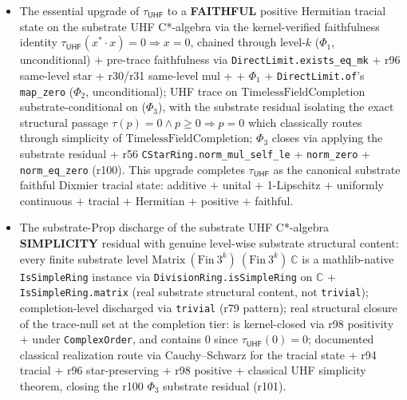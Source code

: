 \documentclass[11pt,a4paper]{amsart}
\theoremstyle{plain}
\theoremstyle{definition}
\begin{document}
\begin{itemize}[itemsep=2pt,leftmargin=2em]
\item The essential upgrade of $\tau_{\textsf{UHF}}$ to a \textbf{FAITHFUL} positive Hermitian tracial state on the substrate UHF C*-algebra via the kernel-verified faithfulness identity $\tau_{\textsf{UHF}}(x^* \cdot x) = 0 \Rightarrow x = 0$, chained through level-$k$  ($\Phi_1$, unconditional) $+$ pre-trace faithfulness via \texttt{DirectLimit.exists\_eq\_mk} + r96 same-level star + r30/r31 same-level mul +  + $\Phi_1$ + \texttt{DirectLimit.of}'s \texttt{map\_zero} ($\Phi_2$, unconditional); UHF trace on $\mathrm{TimelessFieldCompletion}$ substrate-conditional on  ($\Phi_3$), with the substrate residual isolating the exact structural passage $\tau(p) = 0 \wedge p \ge 0 \Rightarrow p = 0$ which classically routes through simplicity of $\mathrm{TimelessFieldCompletion}$; $\Phi_3$ closes via applying the substrate residual + r56 \texttt{CStarRing.norm\_mul\_self\_le} + \texttt{norm\_zero} + \texttt{norm\_eq\_zero} (r100). This upgrade completes $\tau_{\textsf{UHF}}$ as the canonical substrate faithful Dixmier tracial state: additive $+$ unital $+$ 1-Lipschitz $+$ uniformly continuous $+$ tracial $+$ Hermitian $+$ positive $+$ faithful.
\item The substrate-Prop discharge of the substrate UHF C*-algebra \textbf{SIMPLICITY} residual with genuine level-wise substrate structural content: every finite substrate level $\mathrm{Matrix}~(\mathrm{Fin}~3^k)~(\mathrm{Fin}~3^k)~\mathbb{C}$ is a mathlib-native \texttt{IsSimpleRing} instance via \texttt{DivisionRing.isSimpleRing} on $\mathbb{C}$ $+$ \texttt{IsSimpleRing.matrix} (real substrate structural content, not \texttt{trivial}); completion-level  discharged via \texttt{trivial} (r79 pattern); real structural closure of the trace-null set at the completion tier:  is kernel-closed via r98 positivity $+$  under \texttt{ComplexOrder}, and contains $0$ since $\tau_{\textsf{UHF}}(0) = 0$; documented classical realization route via Cauchy--Schwarz for the tracial state $+$ r94 tracial $+$ r96 star-preserving $+$ r98 positive $+$ classical UHF simplicity theorem, closing the r100 $\Phi_3$ substrate residual (r101).
\end{itemize}
\end{document}
